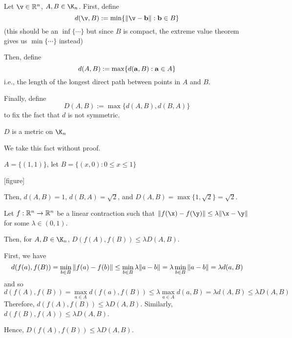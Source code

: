 \documentclass[class=pmath370,tikz,notes]{agony}
\begin{document}
\begin{defn}
  Let $\v \in \R^n$, $A,B \in \K_n$. First, define
  \[ d(\v,B) := \min\{\norm{\v - \vb b} : \vb b \in B\} \]
  (this should be an $\inf\{\cdots\}$ but since $B$ is compact,
  the extreme value theorem gives us $\min\{\cdots\}$ instead)

  Then, define
  \[ d(A,B) := \max\{d(\vb a,B) : \vb a \in A\} \]
  i.e., the length of the longest direct path between points in $A$ and $B$.

  Finally, define
  \[ D(A,B) := \max\{d(A,B), d(B,A)\} \]
  to fix the fact that $d$ is not symmetric.
\end{defn}

\begin{fact}
  $D$ is a metric on $\K_n$
\end{fact}
We take this fact without proof.

\begin{example}
  $A = \{(1,1)\}$, let $B=\{(x, 0): 0 \leq x \leq 1\}$

  [figure]

  Then, $d(A, B) = 1$, $d(B, A) = \sqrt{2}$,
  and $D(A, B) = \max\{1, \sqrt{2}\} = \sqrt{2}$.
\end{example}

\begin{lemma}\label{lem:D1}
  Let $f : \mathbb{R}^n \to \mathbb{R}^n$ be a linear contraction such that
  $\norm{f(\x)-f(\y)} \leq \lambda \norm{\x-\y}$ for some $\lambda \in (0,1)$.

  Then, for $A, B \in \K_n$, $D(f(A), f(B)) \leq \lambda D(A, B)$.
\end{lemma}
\begin{prf}
  First, we have
  \[
    d(f(a), f(B)) = \min_{b \in B} \norm{f(a)-f(b)}
    \leq \min_{b \in B} \lambda \norm{a-b}
    = \lambda \min_{b \in B} \norm{a-b}
    = \lambda d(a, B)
  \]
  and so
  \[
    d(f(A), f(B)) = \max_{a \in A} d(f(a), f(B))
    \leq \lambda \max_{a \in A} d(a, B)
    = \lambda d(A, B)
    \leq \lambda D(A, B)
  \]
  Therefore, $d(f(A), f(B)) \leq \lambda D(A, B)$.
  Similarly, $d(f(B), f(A)) \leq \lambda D(A, B)$.

  Hence, $D(f(A), f(B)) \leq \lambda D(A, B)$.
\end{prf}
\end{document}
